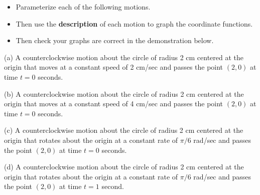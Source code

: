 \documentclass{ximera}
\begin{document}
\begin{example}
\begin{itemize}

\item{Parameterize each of the following motions.}

\item{Then use the {\bf description} of each motion to graph the coordinate functions.}

\item{Then check your graphs are correct in the demonstration below.}

\end{itemize}

(a) A counterclockwise motion about the circle of radius 2 cm centered at the origin that moves at a constant speed of 2 cm/sec and passes the point $(2,0)$ at time $t=0$ seconds.

(b) A counterclockwise motion about the circle of radius 2 cm centered at the origin that moves at a constant speed of 4 cm/sec and passes the point $(2,0)$ at time $t=0$ seconds.

(c) A counterclockwise motion about the circle of radius 2 cm centered at the origin that rotates about the origin at a constant rate of $\pi/6$ rad/sec and passes the point $(2,0)$ at time $t=0$ seconds.

(d) A counterclockwise motion about the circle of radius 2 cm centered at the origin that rotates about the origin at a constant rate of $\pi/6$ rad/sec and passes the point $(2,0)$ at time $t=1$ second.

\begin{exploration}
 
\begin{onlineOnly}
    \begin{center}
\end{center}
\end{onlineOnly}
\end{exploration}


\end{example}
\end{document}

